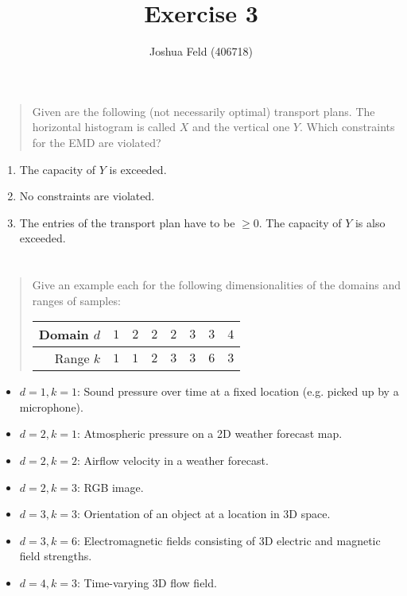 \documentclass[english]{exercise}
\title{Exercise 3}
\author{Joshua Feld (406718)}
\begin{document}
	\maketitle


	\section{}

	\begin{quote}
		Given are the following (not necessarily optimal) transport plans.
		The horizontal histogram is called \(X\) and the vertical one \(Y\).
		Which constraints for the EMD are violated?
	\end{quote}

	\begin{enumerate}
		\item The capacity of \(Y\) is exceeded.
		\item No constraints are violated.
		\item The entries of the transport plan have to be \(\ge 0\). The capacity of \(Y\) is also exceeded.
	\end{enumerate}


	\section{}

	\begin{quote}
		Give an example each for the following dimensionalities of the domains and ranges of samples:
		\begin{center}
			\begin{tabular}{r|ccccccc}
				\toprule
				Domain \(d\) & \(1\) & \(2\) & \(2\) & \(2\) & \(3\) & \(3\) & \(4\)\\
				\midrule
				Range \(k\) & \(1\) & \(1\) & \(2\) & \(3\) & \(3\) & \(6\) & \(3\)\\
				\bottomrule
			\end{tabular}
		\end{center}
	\end{quote}

	\begin{itemize}
		\item \(d = 1, k = 1\): Sound pressure over time at a fixed location (e.g. picked up by a microphone).
		\item \(d = 2, k = 1\): Atmospheric pressure on a 2D weather forecast map.
		\item \(d = 2, k = 2\): Airflow velocity in a weather forecast.
		\item \(d = 2, k = 3\): RGB image.
		\item \(d = 3, k = 3\): Orientation of an object at a location in 3D space.
		\item \(d = 3, k = 6\): Electromagnetic fields consisting of 3D electric and magnetic field strengths.
		\item \(d = 4, k = 3\): Time-varying 3D flow field.
	\end{itemize}
\end{document}
